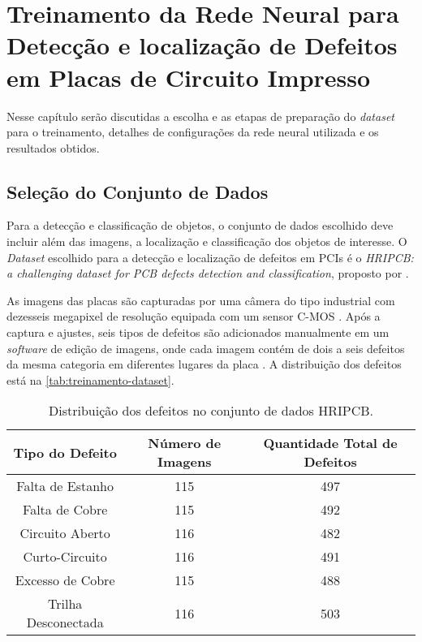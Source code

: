 \chapter{Treinamento da Rede Neural para Detecção e localização de Defeitos em Placas de Circuito Impresso} \label{cap:treinamento}
Nesse capítulo serão discutidas a escolha e as etapas de preparação do \textit{dataset} para o treinamento, detalhes de configurações da rede neural utilizada e os resultados obtidos.

\section{Seleção do Conjunto de Dados} \label{cap:treinamento-dataset}

Para a detecção e classificação de objetos, o conjunto de dados escolhido deve incluir além das imagens, a localização e classificação dos objetos de interesse.
O \textit{Dataset} escolhido para a detecção e localização de defeitos em PCIs é o \textit{HRIPCB: a challenging dataset for PCB defects detection and classification}, proposto por .

As imagens das placas são capturadas por uma câmera do tipo industrial com dezesseis megapixel de resolução equipada com um sensor C-MOS \cite{ref:Huang-et-al}. Após a captura e ajustes, seis tipos de defeitos são adicionados manualmente em um \textit{software} de edição de imagens, onde cada imagem contém de dois a seis defeitos da mesma categoria em diferentes lugares da placa \cite{ref:Huang-et-al}. A distribuição dos defeitos está na \autoref{tab:treinamento-dataset}.

\begin{table}[!ht]
\begin{center}
\caption{Distribuição dos defeitos no conjunto de dados HRIPCB.}
\label{tab:treinamento-dataset}
\begin{tabular}{ccc}
\toprule
\textbf{Tipo do Defeito} & \textbf{Número de Imagens} & \textbf{Quantidade Total de Defeitos} \\
\midrule \midrule
Falta de Estanho    & 115   & 497 \\
Falta de Cobre      & 115   & 492 \\
Circuito Aberto     & 116   & 482 \\
Curto-Circuito      & 116   & 491 \\
Excesso de Cobre    & 115   & 488 \\
Trilha Desconectada & 116   & 503 \\
\bottomrule
\end{tabular}
\end{center}
\end{table}

